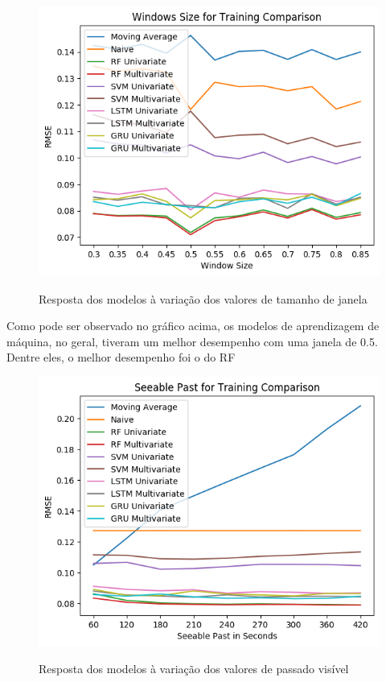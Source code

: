 \begin{figure}[H]
    \centering
    \includegraphics[scale=0.8]{monography/img/windows_size_for_training_comparison_rmse.png}
    \label{figure:rf}
    \caption[Resposta dos modelos à variação dos valores de tamanho de janela]{Resposta dos modelos à variação dos valores de tamanho de janela}
\end{figure} 


Como pode ser observado no gráfico acima, os modelos de aprendizagem de máquina, no geral, tiveram um melhor desempenho com uma janela de 0.5. Dentre eles, o melhor desempenho foi o do \acrshort{RF}

\begin{figure}[H]
    \centering
    \includegraphics[scale=0.8]{monography/img/seeable_past_for_training_comparison_rmse.png}
    \label{figure:rf}
    \caption[Resposta dos modelos à variação dos valores de passado visível]{Resposta dos modelos à variação dos valores de passado visível}
\end{figure}

